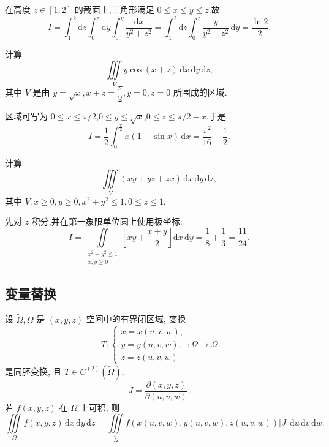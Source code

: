 \begin{solution}
    在高度 $z\in[1,2]$ 的截面上,三角形满足 $0\leq x\leq y\leq z$.故
    \[
        I=\int_1^2\!\mathrm{d}z\int_0^z\!\mathrm{d}y\int_0^y\dfrac{\mathrm{d}x}{y^2+z^2}
        =\int_1^2\!\mathrm{d}z\int_0^z\dfrac{y}{y^2+z^2}\,\mathrm{d}y
        =\dfrac{\ln2}{2}.
    \]
\end{solution}

\begin{example}
    计算
    \[
        \displaystyle\iiint\limits_V y\cos(x+z)\,\mathrm{d}x\,\mathrm{d}y\,\mathrm{d}z,
    \]
    其中 $V$ 是由 $y=\sqrt{x},x+z=\dfrac{\pi}{2},y=0,z=0$ 所围成的区域.
\end{example}
\exampleblank

\begin{solution}
    区域可写为 $0\leq x\leq\pi/2$,$0\leq y\leq\sqrt{x}$,$0\leq z\leq\pi/2-x$.于是
    \[
        I=\dfrac{1}{2}\int_0^{\frac{\pi}{2}}x(1-\sin x)\,\mathrm{d}x
        =\dfrac{\pi^2}{16}-\dfrac{1}{2}.
    \]
\end{solution}

\begin{example}
    计算
    \[
        \displaystyle\iiint\limits_V(xy+yz+zx)\,\mathrm{d}x\,\mathrm{d}y\,\mathrm{d}z,
    \]
    其中 $V:x\geq0,y\geq0,x^2+y^2\leq1,0\leq z\leq1$.
\end{example}
\exampleblank

\begin{solution}
    先对 $z$ 积分,并在第一象限单位圆上使用极坐标:
    \[
        I=\iint\limits_{\substack{x^2+y^2\leq1\\x,y\geq0}}
        \left[xy+\dfrac{x+y}{2}\right]\mathrm{d}x\,\mathrm{d}y
        =\dfrac{1}{8}+\dfrac{1}{3}=\dfrac{11}{24}.
    \]
\end{solution}



\subsection{变量替换}

\begin{theorem}[\markstar]
    设 $\widetilde\Omega,\Omega$ 是 $(x,y,z)$ 空间中的有界闭区域, 变换
    \[
        T:\begin{cases}
            x=x(u,v,w), \\
            y=y(u,v,w), \\
            z=z(u,v,w)
        \end{cases}
        :\widetilde\Omega\to\Omega
    \]
    是同胚变换, 且 $T\in C^{(2)}(\widetilde\Omega)$,
    \[
        J=\dfrac{\partial(x,y,z)}{\partial(u,v,w)}.
    \]
    若 $f(x,y,z)$ 在 $\Omega$ 上可积, 则
    \[
        \displaystyle\iiint\limits_\Omega f(x,y,z)\,\mathrm{d}x\,\mathrm{d}y\,\mathrm{d}z
        =\iiint\limits_{\widetilde\Omega}
        f\left(x(u,v,w),y(u,v,w),z(u,v,w)\right)|J|\,\mathrm{d}u\,\mathrm{d}v\,\mathrm{d}w.
    \]
\end{theorem}

